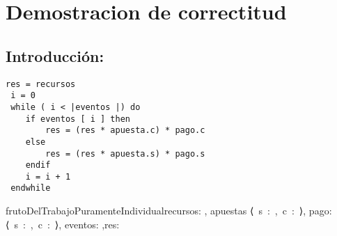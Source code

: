 \documentclass[10pt,a4paper]{article}
\begin{document}
\begin{enumerate}






\end{enumerate}



\section{Demostracion de correctitud}
\subsection{Introducción:}

\begin{lstlisting}[caption=demostraremos la correctitud de este codigo respecto de la siguiente especificacion,label=code:1]
res = recursos
 i = 0
 while ( i < |eventos |) do
    if eventos [ i ] then
        res = (res * apuesta.c) * pago.c
    else
        res = (res * apuesta.s) * pago.s
    endif
    i = i + 1
 endwhile
\end{lstlisting}
\begin{proc}{frutoDelTrabajoPuramenteIndividual}{\In recursos: \float, \In apuestas ⟨\ s\ :\ \float,\ c\ :\ \float⟩, \In pago:⟨\ s\ :\ \float,\ c\ :\ \float⟩, \In eventos: \TLista{\bool},\Out res:\float}{}
\end{proc}
\end{document}
